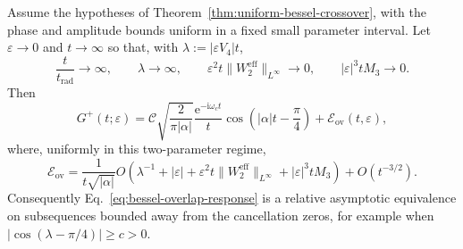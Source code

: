 \begin{theorem}
\label{thm:growing-bessel-morse-overlap}
Assume the hypotheses of Theorem~\ref{thm:uniform-bessel-crossover}, with
the phase and amplitude bounds uniform in a fixed small parameter interval.
Let \(\varepsilon\to0\) and \(t\to\infty\) so that, with
\(\lambda:=|\varepsilon V_4|t\),
\begin{equation}
  \frac{t}{t_{\mathrm{rad}}}\to\infty,
  \qquad
  \lambda\to\infty,
  \qquad
  \varepsilon^2t
    \lVert W_2^{\mathrm{eff}}\rVert_{L^\infty}\to0,
  \qquad
  |\varepsilon|^3tM_3\to0.
  \label{eq:growing-overlap-limit}
\end{equation}
Then
\begin{equation}
  G^{+}(t;\varepsilon)
  =\mathcal C\sqrt{\frac{2}{\pi|\alpha|}}
    \frac{\mathrm e^{-\mathrm i\omega_ct}}{t}
    \cos\left(|\alpha|t-\frac{\pi}{4}\right)
    +\mathcal E_{\mathrm{ov}}(t,\varepsilon),
  \label{eq:bessel-overlap-response}
\end{equation}
where, uniformly in this two-parameter regime,
\begin{equation}
  \mathcal E_{\mathrm{ov}}
  =\frac{1}{t\sqrt{|\alpha|}}
    O\!\left(
      \lambda^{-1}+|\varepsilon|
      +\varepsilon^2t
        \lVert W_2^{\mathrm{eff}}\rVert_{L^\infty}
      +|\varepsilon|^3tM_3
    \right)
    +O(t^{-3/2}).
  \label{eq:growing-overlap-error}
\end{equation}
Consequently Eq.~\eqref{eq:bessel-overlap-response} is a relative
asymptotic equivalence on subsequences bounded away from the cancellation
zeros, for example when
\(\left|\cos(\lambda-\pi/4)\right|\ge c>0\).
\end{theorem}

